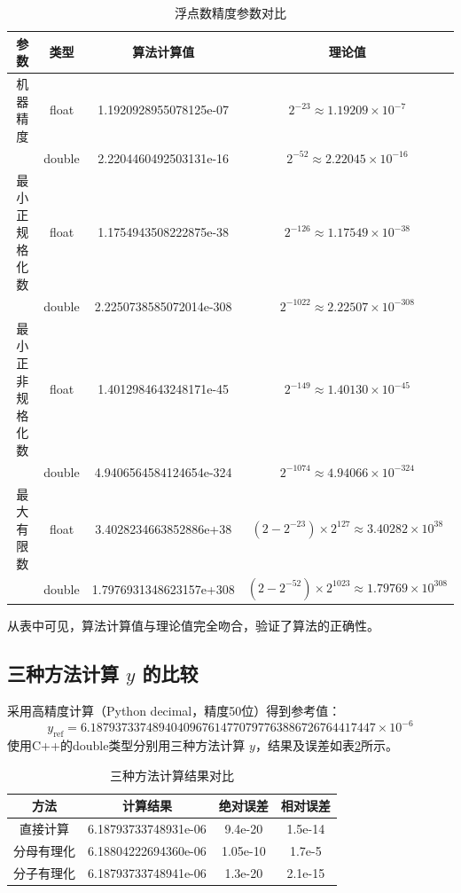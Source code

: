 \documentclass{article}
\begin{document}
\begin{table}[htbp]
\centering
\caption{浮点数精度参数对比}
\label{tab:precision}
\begin{tabular}{|c|c|c|c|}
\hline
参数 & 类型 & 算法计算值 & 理论值 \\
\hline
机器精度 & float & 1.1920928955078125e-07 & \(2^{-23}\approx 1.19209\times10^{-7}\) \\
 & double & 2.2204460492503131e-16 & \(2^{-52}\approx 2.22045\times10^{-16}\) \\
\hline
最小正规格化数 & float & 1.1754943508222875e-38 & \(2^{-126}\approx 1.17549\times10^{-38}\) \\
 & double & 2.2250738585072014e-308 & \(2^{-1022}\approx 2.22507\times10^{-308}\) \\
\hline
最小正非规格化数 & float & 1.4012984643248171e-45 & \(2^{-149}\approx 1.40130\times10^{-45}\) \\
 & double & 4.9406564584124654e-324 & \(2^{-1074}\approx 4.94066\times10^{-324}\) \\
\hline
最大有限数 & float & 3.4028234663852886e+38 & \((2-2^{-23})\times2^{127}\approx3.40282\times10^{38}\) \\
 & double & 1.7976931348623157e+308 & \((2-2^{-52})\times2^{1023}\approx1.79769\times10^{308}\) \\
\hline
\end{tabular}
\end{table}

从表中可见，算法计算值与理论值完全吻合，验证了算法的正确性。

\subsection{三种方法计算 \(y\) 的比较}
采用高精度计算（Python decimal，精度50位）得到参考值：
\[
y_{\text{ref}} = 6.1879373374894040967614770797763886726764417447\times 10^{-6}
\]
使用C++的double类型分别用三种方法计算 \(y\)，结果及误差如表\ref{tab:y}所示。

\begin{table}[htbp]
\centering
\caption{三种方法计算结果对比}
\label{tab:y}
\begin{tabular}{|c|c|c|c|}
\hline
方法 & 计算结果 & 绝对误差 & 相对误差 \\
\hline
直接计算 & 6.18793733748931e-06 & 9.4e-20 & 1.5e-14 \\
分母有理化 & 6.18804222694360e-06 & 1.05e-10 & 1.7e-5 \\
分子有理化 & 6.18793733748941e-06 & 1.3e-20 & 2.1e-15 \\
\hline
\end{tabular}
\end{table}
\end{document}
